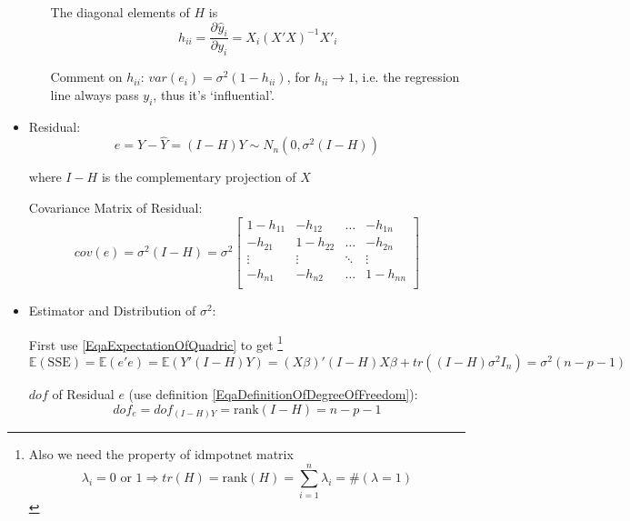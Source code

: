\begin{itemize}[topsep=2pt,itemsep=2pt]
\begin{itemize}[topsep=2pt,itemsep=2pt]
        The diagonal elements of $ H $ is 
        \begin{equation}
            h_{ii}=\dfrac{\partial^{}\hat{y}_i}{\partial y_i^{}}=X_i(X'X)^{-1}X'_i
        \end{equation}

        Comment on $ h_{ii} $: $ var(e_i) =\sigma ^2(1-h_{ii})$, for $ h_{ii}\to 1 $, i.e. the regression line always pass $ y_i $, thus it's `influential'.
    \end{itemize}

    \item Residual:
    \begin{equation}\label{EqaMatrixNotationOfResidual}
        e=Y-\hat{Y}=(I-H)Y\sim N_n\left(0 , \sigma ^2(I-H) \right)
    \end{equation}

    where $ I-H $ is the complementary projection of $ X $

    Covariance Matrix of Residual:
    \begin{equation}
        cov(e)=\sigma ^2(I-H)=
        \sigma ^2\begin{bmatrix}
        1-h_{11}&-h_{12}&\ldots&-h_{1n}\\
        -h_{21}&1-h_{22}&\ldots&-h_{2n}\\
        \vdots&\vdots&\ddots&\vdots\\
        -h_{n1}&-h_{n2}&\ldots&1-h_{nn}\\
        \end{bmatrix}
    \end{equation}
    
    
    \item Estimator and Distribution of  $ \sigma ^2 $:
    
    First use \autoref{EqaExpectationOfQuadric} to get \footnote{Also we need the property of idmpotnet matrix
    \begin{equation}
        \lambda_i=0\text{ or }1\Rightarrow tr(H)=\mathrm{rank}(H)=\sum_{i=1}^n\lambda _i=\# (\lambda =1) 
    \end{equation}
    }
    \begin{equation}\label{EqaExpectationOfSSE}
        \mathbb{E}(\mathrm{SSE})=\mathbb{E}(e'e)=\mathbb{E}(Y'(I-H)Y)=(X\beta )'(I-H)X\beta +tr((I-H)\sigma ^2I_n) =\sigma ^2(n-p-1)
    \end{equation}

    $ dof $ of Residual $ e $ (use definition \autoref{EqaDefinitionOfDegreeOfFreedom}):
    \begin{equation}
        dof_e=dof_{(I-H)Y}=\mathrm{rank}(I-H)=n-p-1 
    \end{equation}
    

\end{itemize}
